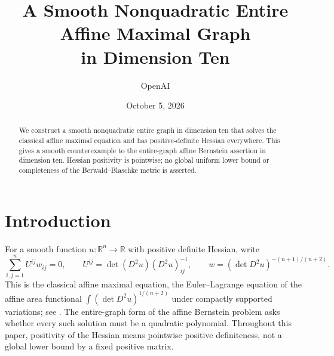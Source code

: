 \documentclass[11pt]{article}
\title{A Smooth Nonquadratic Entire Affine Maximal Graph\\ in Dimension Ten}
\author{OpenAI}
\date{October 5, 2026}
\newcommand{\R}{\mathbb R}
\theoremstyle{remark}
\begin{document}
\maketitle

\begin{abstract}
We construct a smooth nonquadratic entire graph in dimension ten that
solves the classical affine maximal equation and has positive-definite
Hessian everywhere. This gives a smooth counterexample to the
entire-graph affine Bernstein assertion in dimension ten. Hessian
positivity is pointwise; no global uniform lower bound or completeness
of the Berwald--Blaschke metric is asserted.
\end{abstract}

\section{Introduction}
For a smooth function $u:\R^n\to\R$ with positive definite Hessian,
write
\begin{equation}\label{eq:affine}
 \sum_{i,j=1}^n U^{ij}w_{ij}=0,\qquad
 U^{ij}=\det(D^2u)(D^2u)^{-1}_{ij},\qquad
 w=(\det D^2u)^{-(n+1)/(n+2)}.
\end{equation}
This is the classical affine maximal equation, the Euler--Lagrange
equation of the affine area functional
$\int (\det D^2u)^{1/(n+2)}$ under compactly supported variations;
see \cite{TrudingerWang2000}.  The entire-graph form of the affine
Bernstein problem asks whether every such solution must be a
quadratic polynomial.  Throughout this paper, positivity of the
Hessian means pointwise positive definiteness, not a global lower
bound by a fixed positive matrix.
\end{document}
